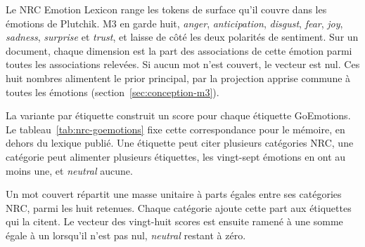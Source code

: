 Le NRC Emotion Lexicon \cite{mohammad2013} range les tokens de surface
qu'il couvre dans les émotions de Plutchik. M3 en garde huit,
\emph{anger}, \emph{anticipation}, \emph{disgust}, \emph{fear},
\emph{joy}, \emph{sadness}, \emph{surprise} et \emph{trust}, et laisse
de côté les deux polarités de sentiment. Sur un document, chaque
dimension est la part des associations de cette émotion parmi toutes
les associations relevées. Si aucun mot n'est couvert, le vecteur est
nul. Ces huit nombres alimentent le prior principal, par la projection
apprise commune à toutes les émotions
(section~\ref{sec:conception-m3}).

La variante par étiquette construit un score pour chaque étiquette
GoEmotions. Le tableau~\ref{tab:nrc-goemotions} fixe cette
correspondance pour le mémoire, en dehors du lexique publié. Une
étiquette peut citer plusieurs catégories NRC, une catégorie peut
alimenter plusieurs étiquettes, les vingt-sept émotions en ont au moins
une, et \emph{neutral} aucune.

Un mot couvert répartit une masse unitaire à parts égales entre ses
catégories NRC, parmi les huit retenues. Chaque catégorie ajoute cette
part aux étiquettes qui la citent. Le vecteur des vingt-huit scores est
ensuite ramené à une somme égale à un lorsqu'il n'est pas nul,
\emph{neutral} restant à zéro.

